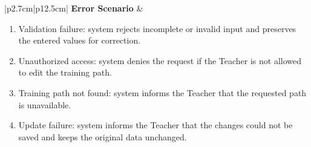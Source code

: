\begin{table}[H]
\begin{tabular}{|p{2.7cm}|p{12.5cm}|}
        \textbf{Error Scenario} & \begin{minipage}[t]{\linewidth}
            \begin{enumerate}[topsep=0pt,itemsep=1pt,parsep=0pt,partopsep=0pt]
                \item Validation failure: system rejects incomplete or invalid input and preserves the entered values for correction.
                \item Unauthorized access: system denies the request if the Teacher is not allowed to edit the training path.
                \item Training path not found: system informs the Teacher that the requested path is unavailable.
                \item Update failure: system informs the Teacher that the changes could not be saved and keeps the original data unchanged.
            \end{enumerate}
        \end{minipage} \\ \hline
    \end{tabular}
\end{table}

